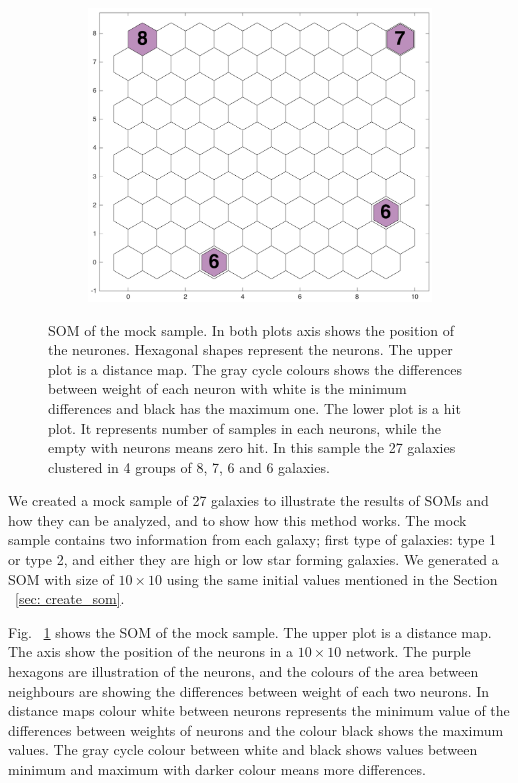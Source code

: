 \begin{figure}
\begin{subfigure}[b]{0.5\textwidth}
                \includegraphics[width=\textwidth]{../images0.01/sample/sample2_hits.png}
            \end{subfigure}
            \caption{SOM of the mock sample. In both plots axis shows the position of the neurones. Hexagonal shapes represent the neurons. The upper plot is a distance map. The gray cycle colours shows the differences between weight of each neuron with white is the minimum differences and black has the maximum one. The lower plot is a hit plot. It represents number of samples in each neurons, while the empty with neurons means zero hit. In this sample the 27 galaxies clustered in 4 groups of 8, 7, 6 and 6 galaxies.}
            \label{fig: sample}
        \end{figure}
 
 We created  a mock sample of 27 galaxies to illustrate the results of SOMs and how they can be analyzed, and to show how this method works.
 The mock sample contains two information from each galaxy; first type of galaxies: type 1 or type 2, and either they are high or low star forming galaxies.
 We generated a SOM with size of $10 \times 10$ using the same initial values mentioned in the Section ~\ref{sec: create_som}.

 Fig. ~\ref{fig: sample} shows the SOM of the mock sample. 
 The upper plot is a distance map. 
 The axis show the position of the neurons in a $10 \times 10$ network. 
 The purple hexagons are illustration of the neurons, and the colours of the area between neighbours are showing the differences between weight of each two neurons.
 In distance maps colour white between neurons represents the minimum value of the differences between weights of neurons and the colour black shows the maximum values. 
 The gray cycle colour between white and black shows values between minimum and maximum with darker colour means more differences.
 
